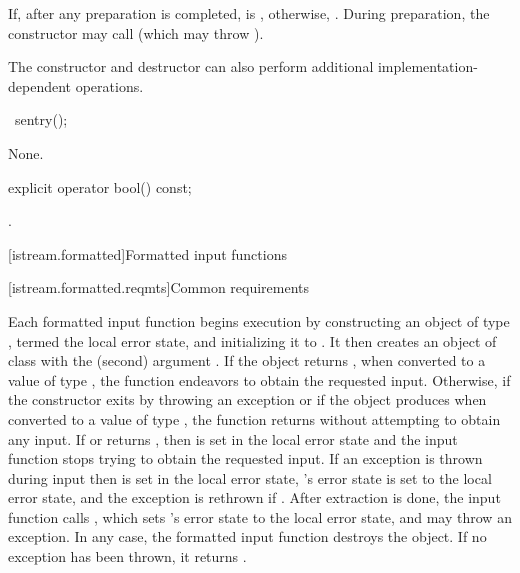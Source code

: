 \begin{itemdescr}
\pnum
If, after any preparation is completed,
is
,
otherwise,
.
During preparation, the constructor may call
(which may throw
).
\begin{footnote}
The
constructor and destructor
can also perform additional
%
implementation-dependent operations.
\end{footnote}
\end{itemdescr}

%
%
\begin{itemdecl}
~sentry();
\end{itemdecl}

\begin{itemdescr}
\pnum
\effects
None.
\end{itemdescr}

%
\begin{itemdecl}
explicit operator bool() const;
\end{itemdecl}

\begin{itemdescr}
\pnum
\returns
{}.
\end{itemdescr}

[istream.formatted]{Formatted input functions}

[istream.formatted.reqmts]{Common requirements}

\pnum
Each formatted input function begins execution by constructing
an object of type , termed the local error state, and
initializing it to .
It then creates an object of class
with the
(second) argument
.
If the
object returns
,
when converted to a value of type
,
the function endeavors
to obtain the requested input.
Otherwise,
if the  constructor exits by throwing an exception or
if the  object produces 
when converted to a value of type ,
the function returns without attempting to obtain any input.
If  or 
returns , then
 is set in the local error state and
the input function stops trying to obtain the requested input.
If an exception is thrown during input then
 is set in the local error state,
's error state is set to the local error state, and
the exception is rethrown if .
After extraction is done, the input function calls , which
sets 's error state to the local error state, and
may throw an exception.
In any case, the formatted input function destroys the
object.
If no exception has been thrown, it returns
.

